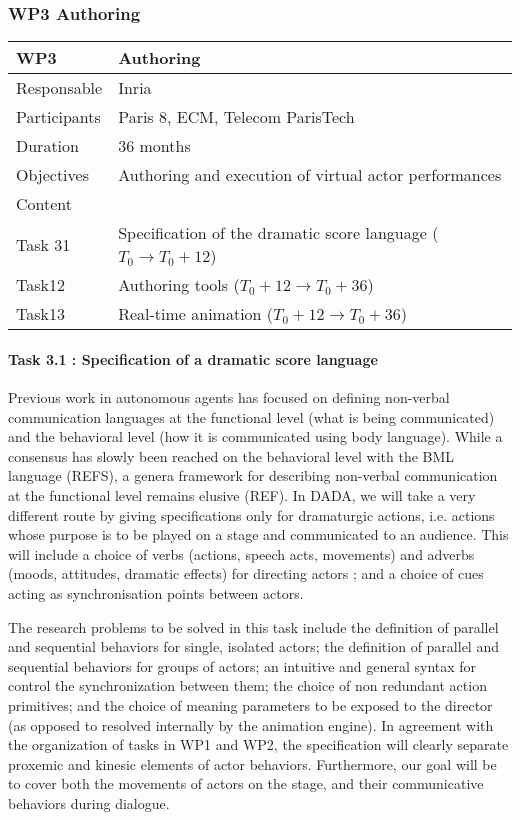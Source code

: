 \subsubsection{WP3 Authoring}


\begin{center}
\begin{tabular}{|l|l|}\hline
WP3 &  Authoring \\\hline
Responsable &  Inria  \\\hline
Participants &  Paris 8, ECM, Telecom ParisTech\\\hline
Duration  &   36 months \\\hline
Objectives &  Authoring and execution of virtual actor performances  \\\hline
Content &  \\\hline
Task 31 & Specification of the dramatic score language  ($T_0 \rightarrow  T_0+12$)  \\\hline
Task12 &  Authoring tools  ($T_0+12 \rightarrow  T_0+36$)  \\\hline
Task13 &  Real-time animation   ($T_0+12 \rightarrow  T_0+36$)  \\\hline
\end{tabular}
\end{center}


\paragraph{Task 3.1 : Specification of a dramatic score language}

Previous work in autonomous agents has focused on defining non-verbal communication languages at the functional level (what is being communicated) and the behavioral level (how it is communicated using body language). While a consensus has slowly been reached on the behavioral level with the BML language (REFS), a genera framework for describing non-verbal communication at the functional level remains elusive (REF). In DADA, we will take a very different route by giving specifications only for dramaturgic actions,
i.e. actions whose purpose is to be played on a stage and communicated to an audience. This will include a choice of verbs (actions, speech acts, movements) and adverbs (moods, attitudes, dramatic effects)  for directing actors ; and a choice of cues acting as synchronisation points between actors.

The research problems to be solved in this task include the definition of parallel and sequential behaviors for single, isolated actors; the definition of parallel and sequential behaviors for groups of actors; an intuitive and general  syntax for control the synchronization between them; the choice of non redundant action primitives; and the choice of meaning parameters to be exposed to the director (as opposed to resolved internally by the animation engine). In agreement with the organization of tasks in WP1 and WP2, the specification will clearly separate proxemic and kinesic elements of actor behaviors. Furthermore,  our goal will be to cover both the movements of actors on the stage, and their communicative behaviors during dialogue. 

